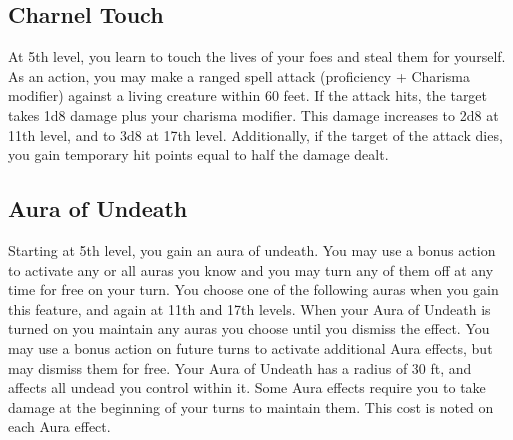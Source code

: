 \documentclass[10pt,twoside,twocolumn,openany]{book}
\begin{document}
\subsection{Charnel Touch}
At 5th level, you learn to touch the lives of your foes and steal them for yourself. As an action, you may make a ranged spell attack (proficiency + Charisma modifier) against a living creature within 60 feet. If the attack hits, the target takes 1d8 damage plus your charisma modifier. This damage increases to 2d8 at 11th level, and to 3d8 at 17th level.
Additionally, if the target of the attack dies, you gain temporary hit points equal to half the damage dealt.

\subsection{Aura of Undeath}
Starting at 5th level, you gain an aura of undeath. You may use a bonus action to activate any or all auras you know and you may turn any of them off at any time for free on your turn.
You choose one of the following auras when you gain this feature, and again at 11th and 17th levels. When your Aura of Undeath is turned on you maintain any auras you choose until you dismiss the effect. You may use a bonus action on future turns to activate additional Aura effects, but may dismiss them for free. Your Aura of Undeath has a radius of 30 ft, and affects all undead you control within it. Some Aura effects require you to take damage at the beginning of your turns to maintain them. This cost is noted on each Aura effect.
\end{document}
